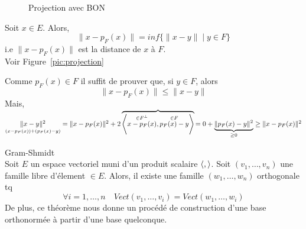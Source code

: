 \begin{figure}[ht]
    \centering
    \caption{Projection avec BON}
    \label{fig:projection-with-bon}
\end{figure}
\begin{prop}
   Soit $x \in E$. Alors,
   \[
       \|x - p_F(x)\| = inf\{\|x - y\| \mid y \in F\}
   \] 
   i.e $\|x - p_F(x)\|$ est la distance de  $x$ à  $F$.\\
   Voir Figure~\ref{pic:projection}
\end{prop}
\begin{preuve}
   Comme $p_F(x) \in F$ il suffit de prouver que, si  $y \in F$, alors 
   \[
   \|x - p_F(x)\| \le \|x - y\|
   \] 
   Mais, $\underset{(x - p_F(x)) + (p_F(x) - y)}{\|x - y\|^2} = \|x - p_F(x)\|^2 + 2\overbrace{\left\langle \overset{\in F^{\perp}}{x - p_F(x)}, \overset{\in F}{p_F(x) - y} \right\rangle}{= 0} + \underbrace{\|p_F(x) - y\|^2}_{\ge 0} \ge \|x - p_F(x)\|^2$
\end{preuve}
\begin{theorem}\label{thm:gram-schmidt}Gram-Shmidt\\
    Soit $E$ un espace vectoriel muni d'un produit scalaire  $\left\langle , \right\rangle$. Soit  $(v_1, \ldots, v_n)$ une famille libre d'élement $\in E$. Alors,  il existe une famille $(w_1, \ldots, w_n)$ orthogonale tq 
    \[
        \forall i = 1, \ldots, n \quad Vect(v_1, \ldots, v_i) = Vect(w_1, \ldots, w_i)
    \] 
    De plus, ce théorème nous donne un procédé de construction d'une base orthonormée à partir d'une base quelconque.
\end{theorem}
